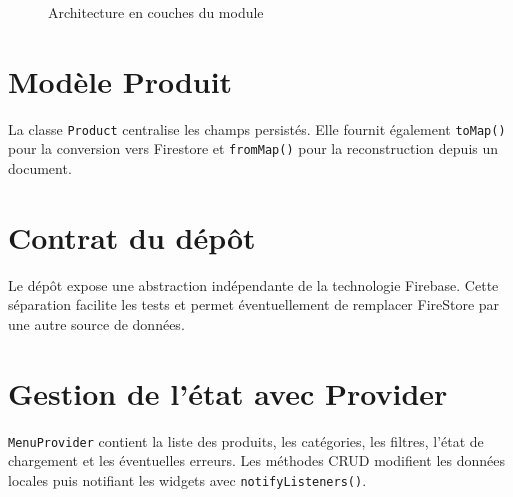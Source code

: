 \documentclass[12pt,a4paper]{report}
\begin{document}
\begin{figure}[H]
\centering
{}
\caption{Architecture en couches du module}
\label{fig:architecture}
\end{figure}

\section{Modèle Produit}

La classe \texttt{Product} centralise les champs persistés. Elle fournit
également \texttt{toMap()} pour la conversion vers Firestore et
\texttt{fromMap()} pour la reconstruction depuis un document.



\section{Contrat du dépôt}

Le dépôt expose une abstraction indépendante de la technologie Firebase.
Cette séparation facilite les tests et permet éventuellement de remplacer
FireStore par une autre source de données.



\section{Gestion de l'état avec Provider}

\texttt{MenuProvider} contient la liste des produits, les catégories, les filtres,
l'état de chargement et les éventuelles erreurs. Les méthodes CRUD modifient
les données locales puis notifiant les widgets avec \texttt{notifyListeners()}.
\end{document}

